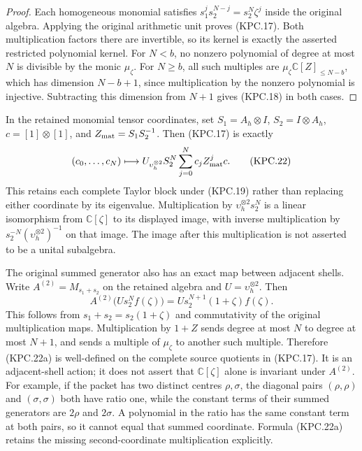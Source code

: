 \begin{proof}
Each homogeneous monomial satisfies
\(s_1^js_2^{N-j}=s_2^N\zeta^j\) inside the original
algebra.  Applying the original arithmetic unit proves (KPC.17).
Both multiplication factors there are invertible, so its kernel
is exactly the asserted restricted polynomial kernel.  For
\(N<b\), no nonzero polynomial of degree at most \(N\)
is divisible by the monic \(\mu_\zeta\).  For \(N\ge b\),
all such multiples are \(\mu_\zeta\mathbb C[Z]_{\le N-b}\),
which has dimension \(N-b+1\), since multiplication by the
nonzero polynomial is injective.  Subtracting this dimension
from \(N+1\) gives (KPC.18) in both cases.
\end{proof}

In the retained monomial tensor coordinates, set
\(S_1=A_h\otimes I\), \(S_2=I\otimes A_h\),
\(c=[1]\otimes[1]\), and \(Z_{\rm mat}=S_1S_2^{-1}\).
Then (KPC.17) is exactly
\[
 (c_0,\ldots,c_N)\longmapsto
 U_{\upsilon_h^{\otimes2}}S_2^N
                \sum_{j=0}^Nc_jZ_{\rm mat}^j c.
 \tag{KPC.22}
\]
This retains each complete Taylor block under (KPC.19) rather
than replacing either coordinate by its eigenvalue.  Multiplication
by \(\upsilon_h^{\otimes2}s_2^N\) is a linear isomorphism
from \(\mathbb C[\zeta]\) to its displayed image, with
inverse multiplication by \(s_2^{-N}(\upsilon_h^{\otimes2})^{-1}\)
on that image.  The image after this multiplication is not asserted
to be a unital subalgebra.

The original summed generator also has an exact map between
adjacent shells.  Write \(A^{(2)}=M_{s_1+s_2}\) on the
retained algebra and \(U=\upsilon_h^{\otimes2}\).  Then
\[
 A^{(2)}\bigl(U s_2^N f(\zeta)\bigr)
        =U s_2^{N+1}(1+\zeta)f(\zeta).
 \tag{KPC.22a}
\]
This follows from \(s_1+s_2=s_2(1+\zeta)\) and
commutativity of the original multiplication maps.  Multiplication
by \(1+Z\) sends degree at most \(N\) to degree at most
\(N+1\), and sends a multiple of \(\mu_\zeta\) to
another such multiple.  Therefore (KPC.22a) is well-defined
on the complete source quotients in (KPC.17).  It is an
adjacent-shell action; it does not assert that
\(\mathbb C[\zeta]\) alone is invariant under
\(A^{(2)}\).  For example, if the packet has two distinct
centres \(\rho,\sigma\), the diagonal pairs
\((\rho,\rho)\) and \((\sigma,\sigma)\) both have
ratio one, while the constant terms of their summed generators
are \(2\rho\) and \(2\sigma\).  A polynomial in the
ratio has the same constant term at both pairs, so it cannot
equal that summed coordinate.  Formula (KPC.22a) retains the
missing second-coordinate multiplication explicitly.

